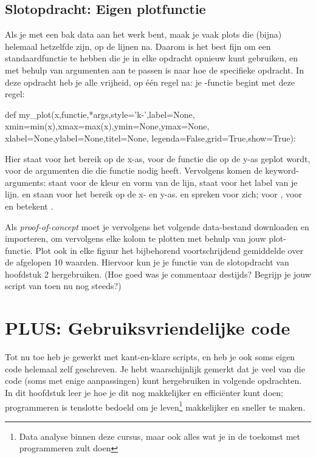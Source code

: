 \documentclass[a4paper,11pt, fleqn]{article}
\newcommand{\ditwc}{Naam van het huidige werkcollege}
\begin{document}
\subsection{Slotopdracht: Eigen plotfunctie}
Als je met een bak data aan het werk bent, maak je vaak plots die (bijna) helemaal hetzelfde zijn, op de lijnen na. Daarom is het best fijn om een standaardfunctie te hebben die je in elke opdracht opnieuw kunt gebruiken, en met behulp van argumenten aan te passen is naar hoe de specifieke opdracht. In deze opdracht heb je alle vrijheid, op \'e\'en regel na: je -functie begint met deze regel:

\begin{python}
def my_plot(x,functie,*args,style='k-',label=None,
	    xmin=min(x),xmax=max(x),ymin=None,ymax=None,
	    xlabel=None,ylabel=None,titel=None,
	    legenda=False,grid=True,show=True):
\end{python}
Hier staat  voor het bereik op de x-as,  voor de functie die op de y-as geplot wordt,  voor de argumenten die die functie nodig heeft. Vervolgens komen de keyword-arguments:  staat voor de kleur en vorm van de lijn,  staat voor het label van je lijn.  en  staan voor het bereik op de x- en y-as.  en  spreken voor zich;  voor ,  voor  en  betekent .

Als {\it proof-of-concept} moet je vervolgens het volgende data-bestand downloaden en importeren, om vervolgens elke kolom te plotten met behulp van jouw plot-functie. Plot ook in elke figuur het bijbehorend voortschrijdend gemiddelde over de afgelopen 10 waarden. Hiervoor kun je je functie van de slotopdracht van hoofdstuk 2 hergebruiken. (Hoe goed was je commentaar destijds? Begrijp je jouw script van toen nu nog steeds?)

\clearpage

\iffalse
\renewcommand{\ditwc}{PLUS: Gebruiksvriendelijke code}
\section[PLUS: Gebruiksvriendelijke code]{\ditwc}

Tot nu toe heb je gewerkt met kant-en-klare scripts, en heb je ook soms eigen code helemaal zelf geschreven. Je hebt waarschijnlijk gemerkt dat je veel van die code (soms met enige aanpassingen) kunt hergebruiken in volgende opdrachten. In dit hoofdstuk leer je hoe je dit nog makkelijker en effici\"enter kunt doen; programmeren is tenslotte bedoeld om je leven\footnote{Data analyse binnen deze cursus, maar ook alles wat je in de toekomst met programmeren zult doen} makkelijker en sneller te maken.
\end{document}
